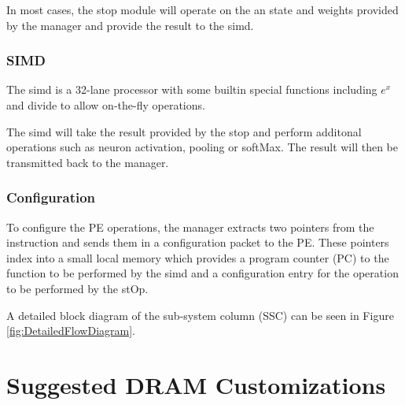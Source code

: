 \documentclass[journal]{IEEEtran}
\begin{document}
In most cases, the \ac{stop} module will operate on the \ac{an} state and weights provided by the manager and provide the result to the \ac{simd}.
\subsubsection{SIMD}
\label{ssec:SIMD}

The \ac{simd} is a 32-lane processor with some builtin special functions including $e^x$ and divide to allow on-the-fly operations. 

The \ac{simd} will take the result provided by the \ac{stop} and perform additonal operations such as neuron activation, pooling or softMax. The result will then be transmitted back to the manager.

\subsubsection{Configuration}
\label{ssec:peConfiguration}

To configure the PE operations, the manager extracts two pointers from the instruction and sends them in a configuration packet to the PE. These pointers index into a small local memory which provides a program counter (PC) to the function to be performed by the \ac{simd} and a configuration entry for the operation to be performed by the stOp.
 

\bigskip
A detailed block diagram of the sub-system column (SSC) can be seen in Figure \ref{fig:DetailedFlowDiagram}.

\section{Suggested DRAM Customizations}
\label{sec:Suggested DRAM Customizations}
\end{document}
